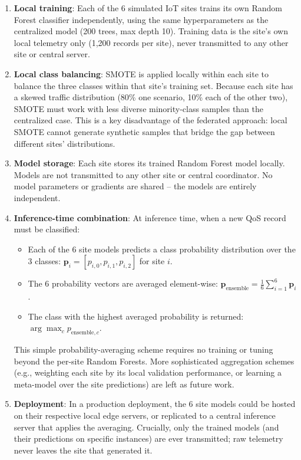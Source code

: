 \begin{enumerate}
  \item \textbf{Local training}: Each of the 6 simulated IoT sites trains its own Random Forest classifier independently, using the same hyperparameters as the centralized model (200 trees, max depth 10). Training data is the site's own local telemetry only (1,200 records per site), never transmitted to any other site or central server.
  
  \item \textbf{Local class balancing}: SMOTE is applied locally within each site to balance the three classes within that site's training set. Because each site has a skewed traffic distribution (80\% one scenario, 10\% each of the other two), SMOTE must work with less diverse minority-class samples than the centralized case. This is a key disadvantage of the federated approach: local SMOTE cannot generate synthetic samples that bridge the gap between different sites' distributions.
  
  \item \textbf{Model storage}: Each site stores its trained Random Forest model locally. Models are not transmitted to any other site or central coordinator. No model parameters or gradients are shared -- the models are entirely independent.
  
  \item \textbf{Inference-time combination}: At inference time, when a new QoS record must be classified:
  \begin{itemize}
    \item Each of the 6 site models predicts a class probability distribution over the 3 classes: $\mathbf{p}_i = [p_{i,0}, p_{i,1}, p_{i,2}]$ for site $i$.
    \item The 6 probability vectors are averaged element-wise: $\mathbf{p}_{\text{ensemble}} = \frac{1}{6} \sum_{i=1}^{6} \mathbf{p}_i$.
    \item The class with the highest averaged probability is returned: $\arg\max_c p_{\text{ensemble},c}$.
  \end{itemize}
  This simple probability-averaging scheme requires no training or tuning beyond the per-site Random Forests. More sophisticated aggregation schemes (e.g., weighting each site by its local validation performance, or learning a meta-model over the site predictions) are left as future work.
  
  \item \textbf{Deployment}: In a production deployment, the 6 site models could be hosted on their respective local edge servers, or replicated to a central inference server that applies the averaging. Crucially, only the trained models (and their predictions on specific instances) are ever transmitted; raw telemetry never leaves the site that generated it.
\end{enumerate}

